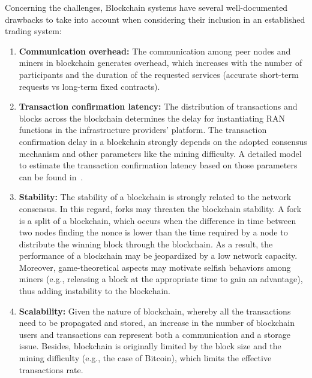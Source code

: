 \documentclass[journal]{IEEEtran}
\begin{document}
	Concerning the challenges, Blockchain systems have several well-documented drawbacks to take into account when considering their inclusion in an established trading system: 
	\begin{enumerate}
		\item \textbf{Communication overhead:} The communication among peer nodes and miners in blockchain generates overhead, which increases with the number of participants and the duration of the requested services (accurate short-term requests vs long-term fixed contracts).
		\item \textbf{Transaction confirmation latency:} The distribution of transactions and blocks across the blockchain determines the delay for instantiating RAN functions in the infrastructure providers' platform. The transaction confirmation delay in a blockchain strongly depends on the adopted consensus mechanism and other parameters like the mining difficulty. A detailed model to estimate the transaction confirmation latency based on those parameters can be found in~\cite{FWilhelmi_PIMRC}.
		\item \textbf{Stability:} The stability of a blockchain is strongly related to the network consensus. In this regard, forks may threaten the blockchain stability. A fork is a split of a blockchain, which occurs when the difference in time between two nodes finding the nonce is lower than the time required by a node to distribute the winning block through the blockchain. As a result, the performance of a blockchain may be jeopardized by a low network capacity. Moreover, game-theoretical aspects may motivate selfish behaviors among miners (e.g., releasing a block at the appropriate time to gain an advantage), thus adding instability to the blockchain. %
		\item \textbf{Scalability:} Given the nature of blockchain, whereby all the transactions need to be propagated and stored, an increase in the number of blockchain users and transactions can represent both a communication and a storage issue. Besides, blockchain is originally limited by the block size and the mining difficulty (e.g., the case of Bitcoin), which limits the effective transactions rate. 
	\end{enumerate}
	
\end{document}
